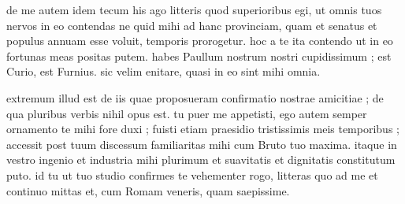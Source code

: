  de me autem idem tecum his ago litteris quod superioribus egi, ut omnis tuos nervos in eo contendas ne quid mihi ad hanc provinciam, quam et senatus et populus annuam esse voluit, temporis prorogetur. hoc a te ita contendo ut in eo fortunas meas positas putem. habes Paullum nostrum nostri cupidissimum ; est Curio, est Furnius. sic velim enitare, quasi in eo sint mihi omnia.

 extremum illud est de iis quae proposueram confirmatio nostrae amicitiae ; de qua pluribus verbis nihil opus est. tu puer me appetisti, ego autem semper ornamento te mihi fore duxi ; fuisti etiam praesidio tristissimis meis temporibus ; accessit post tuum discessum familiaritas mihi cum Bruto tuo maxima. itaque in vestro ingenio et industria mihi plurimum et suavitatis et dignitatis constitutum puto. id tu ut tuo studio confirmes te vehementer rogo, litteras quo ad me et continuo mittas et, cum Romam veneris, quam saepissime.
